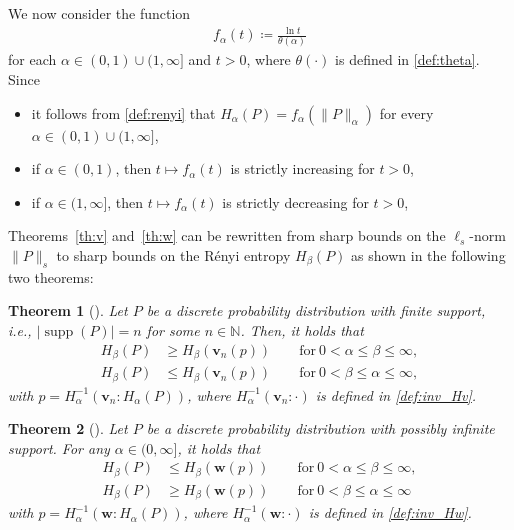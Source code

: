 \documentclass[conference, draftcls, onecolumn]{IEEEtran}
\theoremstyle{plain}
\newtheorem{theorem}{Theorem}
\newcommand{\bvec}[1]{\boldsymbol{#1}}
\newcommand{\supp}{\operatorname{supp}}
\begin{document}
We now consider the function
\begin{align}
f_{\alpha}( t )
\coloneqq
\frac{ \ln t }{ \theta( \alpha ) } 
\end{align}
for each $\alpha \in (0, 1) \cup (1, \infty]$ and $t > 0$, where $\theta( \cdot )$ is defined in \eqref{def:theta}.
Since
\begin{itemize}
\item
it follows from \eqref{def:renyi} that $H_{\alpha}( P ) = f_{\alpha}( \| P \|_{\alpha} )$ for every $\alpha \in (0, 1) \cup (1, \infty]$,
\item
if $\alpha \in (0, 1)$, then $t \mapsto f_{\alpha}( t )$ is strictly increasing for $t > 0$,
\item
if $\alpha \in (1, \infty]$, then $t \mapsto f_{\alpha}( t )$ is strictly decreasing for $t > 0$,
\end{itemize}
Theorems~\ref{th:v} and~\ref{th:w} can be rewritten from sharp bounds on the $\ell_{s}$-norm $\| P \|_{s}$ to sharp bounds on the R\'{e}nyi entropy $H_{\beta}( P )$ as shown in the following two theorems:




\begin{theorem}[{\cite[Theorem~2]{itw2016_reject}}]
\label{th:renyi_v}
Let $P$ be a discrete probability distribution with finite support, i.e., $|\!\supp(P)| = n$ for some $n \in \mathbb{N}$.
Then, it holds that
\begin{align}
H_{\beta}( P )
& \ge
H_{\beta}( \bvec{v}_{n}( p ) )
\qquad \mathrm{for} \ 0 < \alpha \le \beta \le \infty ,
\label{ineq:renyi_v_1} \\
H_{\beta}( P )
& \le
H_{\beta}( \bvec{v}_{n}( p ) )
\qquad \mathrm{for} \ 0 < \beta \le \alpha \le \infty ,
\label{ineq:renyi_v_2}
\end{align}
with $p = H_{\alpha}^{-1}( \bvec{v}_{n} : H_{\alpha}( P ) )$, where $H_{\alpha}^{-1}( \bvec{v}_{n} : \cdot )$ is defined in \eqref{def:inv_Hv}.
\end{theorem}




\begin{theorem}[{\cite[Theorem~2]{itw2016_reject}}]
\label{th:renyi_w}
Let $P$ be a discrete probability distribution with possibly infinite support.
For any $\alpha \in (0, \infty]$, it holds that
\begin{align}
H_{\beta}( P )
& \le
H_{\beta}( \bvec{w}( p ) )
\qquad \mathrm{for} \ 0 < \alpha \le \beta \le \infty ,
\\
H_{\beta}( P )
& \ge
H_{\beta}( \bvec{w}( p ) )
\qquad \mathrm{for} \ 0 < \beta \le \alpha \le \infty
\end{align}
with $p = H_{\alpha}^{-1}( \bvec{w} : H_{\alpha}( P ) )$, where $H_{\alpha}^{-1}( \bvec{w} : \cdot )$ is defined in \eqref{def:inv_Hw}.
\end{theorem}
\end{document}
